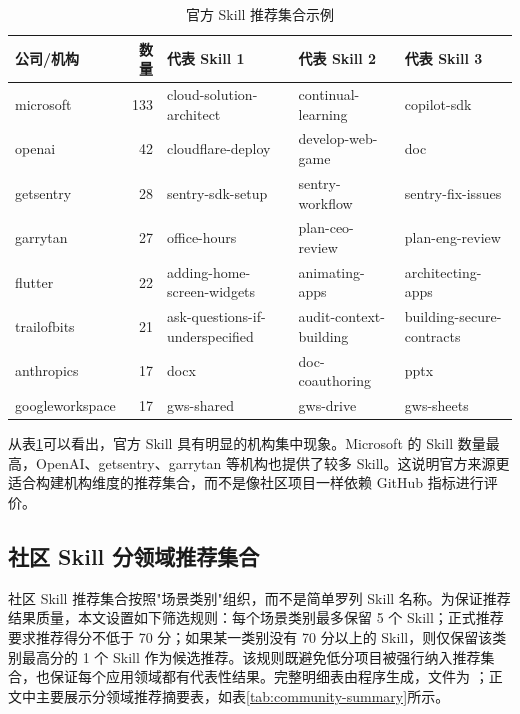 \documentclass[UTF8,a4paper,12pt]{ctexart}
\begin{document}
\begin{table}[H]
\centering
\caption{官方 Skill 推荐集合示例}
\label{tab:official}
\small
\begin{tabularx}{\textwidth}{l r X X X}
\toprule
公司/机构 & 数量 & 代表 Skill 1 & 代表 Skill 2 & 代表 Skill 3 \\
\midrule
microsoft & 133 & cloud-solution-architect & continual-learning & copilot-sdk \\
openai & 42 & cloudflare-deploy & develop-web-game & doc \\
getsentry & 28 & sentry-sdk-setup & sentry-workflow & sentry-fix-issues \\
garrytan & 27 & office-hours & plan-ceo-review & plan-eng-review \\
flutter & 22 & adding-home-screen-widgets & animating-apps & architecting-apps \\
trailofbits & 21 & ask-questions-if-underspecified & audit-context-building & building-secure-contracts \\
anthropics & 17 & docx & doc-coauthoring & pptx \\
googleworkspace & 17 & gws-shared & gws-drive & gws-sheets \\
\bottomrule
\end{tabularx}
\end{table}

从表\ref{tab:official}可以看出，官方 Skill 具有明显的机构集中现象。Microsoft 的 Skill 数量最高，OpenAI、getsentry、garrytan 等机构也提供了较多 Skill。这说明官方来源更适合构建机构维度的推荐集合，而不是像社区项目一样依赖 GitHub 指标进行评价。

\subsection{社区 Skill 分领域推荐集合}

社区 Skill 推荐集合按照"场景类别"组织，而不是简单罗列 Skill 名称。为保证推荐结果质量，本文设置如下筛选规则：每个场景类别最多保留 5 个 Skill；正式推荐要求推荐得分不低于 70 分；如果某一类别没有 70 分以上的 Skill，则仅保留该类别最高分的 1 个 Skill 作为候选推荐。该规则既避免低分项目被强行纳入推荐集合，也保证每个应用领域都有代表性结果。完整明细表由程序生成，文件为 ；正文中主要展示分领域推荐摘要表，如表\ref{tab:community-summary}所示。
\end{document}

